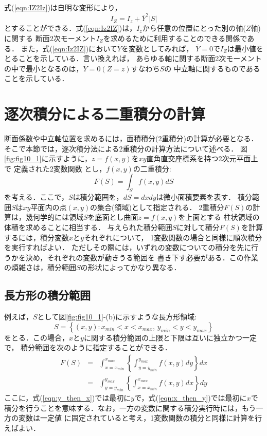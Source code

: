 ﻿\documentclass[10pt,a4j]{jbook}
\begin{document}
式(\ref{eqn:IZ2Iz})は自明な変形により，
\begin{equation}
	I_Z=I_z+\bar Y^2 \left| S \right|
	\label{eqn:Iz2IZ}
\end{equation}
とすることができる．式(\ref{eqn:Iz2IZ})は，$I_z$から任意の位置にとった別の軸($Z$軸)に関する
断面2次モーメント$I_Z$を求めるために利用することのできる関係である．
また，式(\ref{eqn:Iz2IZ})において$\bar{Y}$を変数としてみれば，
$\bar{Y}=0$で$I_Z$は最小値をとることを示している．言い換えれば，
あらゆる軸に関する断面2次モーメントの中で最小となるのは，$\bar Y=0 (Z=z)$すなわち$S$の
中立軸に関するものであることを示している．
\section{逐次積分による二重積分の計算}
断面係数や中立軸位置を求めるには，面積積分(2重積分)の計算が必要となる．
そこで本節では，逐次積分法による2重積分の計算方法について述べる．
図\ref{fig:fig10_1}に示すように，$z=f(x,y)$を$xy$直角直交座標系を持つ2次元平面上で
定義された2変数関数
とし，$f(x,y)$の二重積分:
\begin{equation}
	F(S)=\int_S f(x,y) dS
	\label{eqn:Int2D}
\end{equation}
を考える．ここで，$S$は積分範囲を，$dS=dxdy$は微小面積要素を表す．
積分範囲$S$は$xy$平面内の点$(x,y)$の集合(領域)として指定される．
2重積分$F(S)$の計算は，幾何学的には領域$S$を底面とし曲面$z=f(x,y)$を上面とする
柱状領域の体積を求めることに相当する．
与えられた積分範囲$S$に対して積分$F(S)$を計算するには，積分変数$x$と$y$それぞれについて，
1変数関数の場合と同様に順次積分を実行すればよい．
ただしその際には，いずれの変数についての積分を先に行うかを決め，それぞれの変数が動きうる範囲を
書き下す必要がある．この作業の煩雑さは，積分範囲$S$の形状によってかなり異なる．
\subsection{長方形の積分範囲}
例えば，$S$として図\ref{fig:fig10_1}-(b)に示すような長方形領域:
\begin{equation}
	S=\left\{(x,y):x_{min}<x<x_{max}, \, y_{min}<y<y_{max} \right\}
	\label{eqn:Sa}
\end{equation}
をとる．この場合，$x$と$y$に関する積分範囲の上限と下限は互いに独立かつ一定で，
積分範囲を次のように指定することができる．
\begin{eqnarray}
	F(S)
	&=&
	\int_{x=x_{min}}^{x_{max}}\left\{\int_{y=y_{min}}^{y_{max}} f(x,y)dy\right\} dx
	\label{eqn:y_then_x}
	\\
	&=&
	\int_{y=y_{min}}^{y_{max}}\left\{\int_{x=x_{min}}^{x_{max}} f(x,y)dx\right\} dy
	\label{eqn:x_then_y}
\end{eqnarray}
ここに，式(\ref{eqn:y_then_x})では最初に$y$で，式(\ref{eqn:x_then_y})では最初に$x$で
積分を行うことを意味する．なお，一方の変数に関する積分実行時には，もう一方の変数は一定値
に固定されていると考え，1変数関数の積分と同様に計算を行えばよい．
\end{document}
